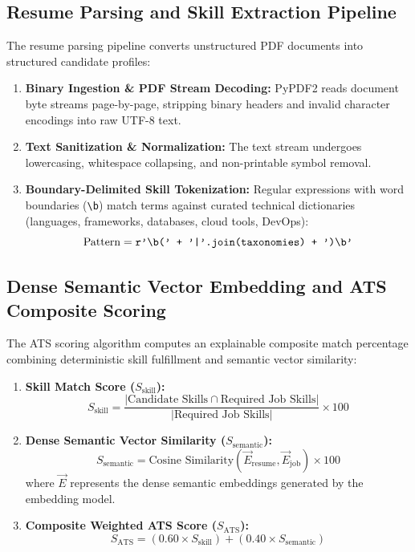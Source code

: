 \subsection{Resume Parsing and Skill Extraction Pipeline}
The resume parsing pipeline converts unstructured PDF documents into structured candidate profiles:
\begin{enumerate}
    \item \textbf{Binary Ingestion \& PDF Stream Decoding:} PyPDF2 reads document byte streams page-by-page, stripping binary headers and invalid character encodings into raw UTF-8 text.
    \item \textbf{Text Sanitization \& Normalization:} The text stream undergoes lowercasing, whitespace collapsing, and non-printable symbol removal.
    \item \textbf{Boundary-Delimited Skill Tokenization:} Regular expressions with word boundaries (\texttt{\textbackslash b}) match terms against curated technical dictionaries (languages, frameworks, databases, cloud tools, DevOps):
    \begin{equation}
        \text{Pattern} = \text{\texttt{r'\textbackslash b(' + '|'.join(taxonomies) + ')\textbackslash b'}}
    \end{equation}
\end{enumerate}

\subsection{Dense Semantic Vector Embedding and ATS Composite Scoring}
The ATS scoring algorithm computes an explainable composite match percentage combining deterministic skill fulfillment and semantic vector similarity:
\begin{enumerate}
    \item \textbf{Skill Match Score ($S_{\text{skill}}$):}
    \begin{equation}
        S_{\text{skill}} = \frac{|\text{Candidate Skills} \cap \text{Required Job Skills}|}{|\text{Required Job Skills}|} \times 100
    \end{equation}
    \item \textbf{Dense Semantic Vector Similarity ($S_{\text{semantic}}$):}
    \begin{equation}
        S_{\text{semantic}} = \text{Cosine Similarity}(\vec{E}_{\text{resume}}, \vec{E}_{\text{job}}) \times 100
    \end{equation}
    where $\vec{E}$ represents the dense semantic embeddings generated by the embedding model.
    \item \textbf{Composite Weighted ATS Score ($S_{\text{ATS}}$):}
    \begin{equation}
        S_{\text{ATS}} = (0.60 \times S_{\text{skill}}) + (0.40 \times S_{\text{semantic}})
    \end{equation}
\end{enumerate}

